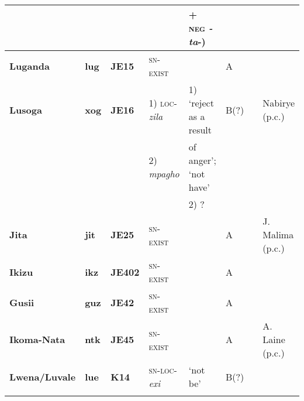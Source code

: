 \documentclass[output=paper]{langsci/langscibook}
\begin{document}
\begin{sidewaystable}[p]
\begin{scriptsize}
\begin{tabularx}{\textwidth}{llllllll}
				&				&				&				&+ \textsc{neg} \textit{-ta}-)\\\midrule
\textbf{Luganda}	&\textbf{lug}		&\textbf{JE15}	&\textsc{sn-exist}	&\textendash								&A{}	&												&\citet{AshtonMulira1954}\\\midrule
\textbf{Lusoga}	&\textbf{xog}	&\textbf{JE16}	&1) \textsc{loc}-\textit{zila}&1) `reject as a result			&B(?) 	&												&Nabirye (p.c.)\\
				&				&				&2) \textit{mpagho} &of anger'; `not have'\\
				&				&				&				&2) ?\\\midrule
\textbf{Jita}		&\textbf{jit}		&\textbf{JE25}	&\textsc{sn-exist}	&\textendash								&A{}	& 												&J. Malima (p.c.)\\\midrule
\textbf{Ikizu} 	&\textbf{ikz}		&\textbf{JE402}	&\textsc{sn-exist}	&\textendash								&A{}	& 												&\citet{Gray2013}\\\midrule
\textbf{Gusii} 	&\textbf{guz} 	&\textbf{JE42} 	&\textsc{sn-exist}	&\textendash								&A{}	& 												&\citet{Whiteley1956}\\\midrule
\textbf{Ikoma-Nata}&\textbf{ntk}	&\textbf{JE45} 	&\textsc{sn-exist}	&\textendash								&A{}	& 												&A. Laine (p.c.)\\\midrule
\textbf{Lwena/Luvale} &\textbf{lue}&\textbf{K14}	&\textsc{sn-loc}-\textit{exi}&`not be'						&B(?)	&												&\citet{Horton1949}\\
\lspbottomrule
\end{tabularx}\end{scriptsize}
\end{sidewaystable}
\end{document}
